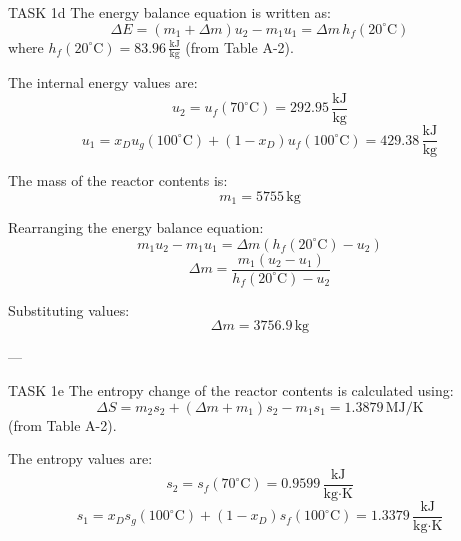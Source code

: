 TASK 1d  
The energy balance equation is written as:  
\[
\Delta E = (m_1 + \Delta m) u_2 - m_1 u_1 = \Delta m \, h_f(20^\circ\text{C})
\]  
where \( h_f(20^\circ\text{C}) = 83.96 \, \frac{\text{kJ}}{\text{kg}} \) (from Table A-2).  

The internal energy values are:  
\[
u_2 = u_f(70^\circ\text{C}) = 292.95 \, \frac{\text{kJ}}{\text{kg}}
\]  
\[
u_1 = x_D u_g(100^\circ\text{C}) + (1 - x_D) u_f(100^\circ\text{C}) = 429.38 \, \frac{\text{kJ}}{\text{kg}}
\]  

The mass of the reactor contents is:  
\[
m_1 = 5755 \, \text{kg}
\]  

Rearranging the energy balance equation:  
\[
m_1 u_2 - m_1 u_1 = \Delta m (h_f(20^\circ\text{C}) - u_2)
\]  
\[
\Delta m = \frac{m_1 (u_2 - u_1)}{h_f(20^\circ\text{C}) - u_2}
\]  

Substituting values:  
\[
\Delta m = 3756.9 \, \text{kg}
\]  

---

TASK 1e  
The entropy change of the reactor contents is calculated using:  
\[
\Delta S = m_2 s_2 + (\Delta m + m_1) s_2 - m_1 s_1 = 1.3879 \, \text{MJ/K}
\]  
(from Table A-2).  

The entropy values are:  
\[
s_2 = s_f(70^\circ\text{C}) = 0.9599 \, \frac{\text{kJ}}{\text{kg·K}}
\]  
\[
s_1 = x_D s_g(100^\circ\text{C}) + (1 - x_D) s_f(100^\circ\text{C}) = 1.3379 \, \frac{\text{kJ}}{\text{kg·K}}
\]  

